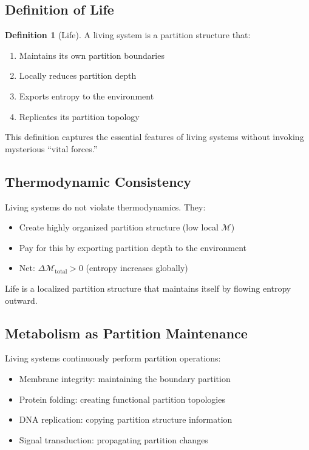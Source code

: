 ﻿\documentclass[twocolumn,10pt,a4paper]{article}
\theoremstyle{definition}
\newtheorem{definition}[theorem]{Definition}
\theoremstyle{remark}
\newcommand{\Depth}{\mathcal{M}}
\begin{document}
\subsection{Definition of Life}

\begin{definition}[Life]
\label{def:life}
A living system is a partition structure that:
\begin{enumerate}
    \item Maintains its own partition boundaries
    \item Locally reduces partition depth
    \item Exports entropy to the environment
    \item Replicates its partition topology
\end{enumerate}
\end{definition}

This definition captures the essential features of living systems without invoking mysterious ``vital forces.''

\subsection{Thermodynamic Consistency}

Living systems do not violate thermodynamics. They:
\begin{itemize}
    \item Create highly organized partition structure (low local $\Depth$)
    \item Pay for this by exporting partition depth to the environment
    \item Net: $\Delta\Depth_{\mathrm{total}} > 0$ (entropy increases globally)
\end{itemize}

Life is a localized partition structure that maintains itself by flowing entropy outward.

\subsection{Metabolism as Partition Maintenance}

Living systems continuously perform partition operations:
\begin{itemize}
    \item Membrane integrity: maintaining the boundary partition
    \item Protein folding: creating functional partition topologies
    \item DNA replication: copying partition structure information
    \item Signal transduction: propagating partition changes
\end{itemize}
\end{document}
